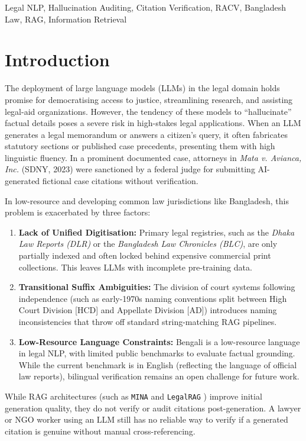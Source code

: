 \documentclass[conference]{IEEEtran}
\begin{document}
\begin{IEEEkeywords}
Legal NLP, Hallucination Auditing, Citation Verification, RACV, Bangladesh Law, RAG, Information Retrieval
\end{IEEEkeywords}

\section{Introduction}
The deployment of large language models (LLMs) in the legal domain holds promise for democratising access to justice, streamlining research, and assisting legal-aid organizations. However, the tendency of these models to ``hallucinate'' factual details poses a severe risk in high-stakes legal applications. When an LLM generates a legal memorandum or answers a citizen's query, it often fabricates statutory sections or published case precedents, presenting them with high linguistic fluency. In a prominent documented case, attorneys in \textit{Mata v. Avianca, Inc.} (SDNY, 2023) \cite{mata2023} were sanctioned by a federal judge for submitting AI-generated fictional case citations without verification.

In low-resource and developing common law jurisdictions like Bangladesh, this problem is exacerbated by three factors:
\begin{enumerate}
\item \textbf{Lack of Unified Digitisation:} Primary legal registries, such as the \textit{Dhaka Law Reports (DLR)} or the \textit{Bangladesh Law Chronicles (BLC)}, are only partially indexed and often locked behind expensive commercial print collections. This leaves LLMs with incomplete pre-training data.
\item \textbf{Transitional Suffix Ambiguities:} The division of court systems following independence (such as early-1970s naming conventions split between High Court Division [HCD] and Appellate Division [AD]) introduces naming inconsistencies that throw off standard string-matching RAG pipelines.
\item \textbf{Low-Resource Language Constraints:} Bengali is a low-resource language in legal NLP, with limited public benchmarks to evaluate factual grounding. While the current benchmark is in English (reflecting the language of official law reports), bilingual verification remains an open challenge for future work.
\end{enumerate}

While RAG architectures (such as \texttt{MINA} \cite{mina2026} and \texttt{LegalRAG} \cite{legalrag2025}) improve initial generation quality, they do not verify or audit citations post-generation. A lawyer or NGO worker using an LLM still has no reliable way to verify if a generated citation is genuine without manual cross-referencing.
\end{document}
